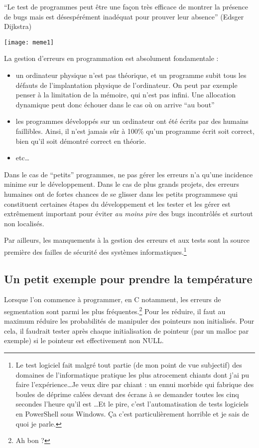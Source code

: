 \documentclass[../../../main.tex]{subfiles}
\begin{document}
``Le test de programmes peut être une façon très efficace de montrer la présence de bugs mais est désespérément inadéquat pour prouver leur absence'' (Edsger Dijkstra)
\begin{minipage}{\textwidth}
	\begin{center}
		\texttt{[image: meme1]}
	\end{center}
\end{minipage}

La gestion d'erreurs en programmation est absolument fondamentale :
\begin{itemize}
	\item un ordinateur physique n'est pas théorique, et un programme subit tous les défauts de l'implantation physique de l'ordinateur. On peut par exemple penser à la limitation de la mémoire, qui n'est pas infini. Une allocation dynamique peut donc échouer dans le cas où on arrive ``au bout''
	\item les programmes développés sur un ordinateur ont été écrits par des humains faillibles. Ainsi, il n'est jamais sûr à 100\% qu'un programme écrit soit correct, bien qu'il soit démontré correct en théorie.
	\item etc\dots
\end{itemize}
Dans le cas de ``petits'' programmes, ne pas gérer les erreurs n'a qu'une incidence minime sur le développement. Dans le cas de plus grands projets, des erreurs humaines ont de fortes chances de se glisser dans les petits programmese qui constituent certaines étapes du développement et les tester et les gérer est extrêmement important pour éviter \textit{au moins pire} des bugs incontrôlés et surtout non localisés.

Par ailleurs, les manquements à la gestion des erreurs et aux tests sont la source première des failles de sécurité des systèmes informatiques.\footnote{Le test logiciel fait malgré tout partie (de mon point de vue subjectif) des domaines de l'informatique pratique les plus atrocement chiants dont j'ai pu faire l'expérience\dots Je veux dire par chiant : un ennui morbide qui fabrique des boules de déprime calées devant des écrans à se demander toutes les cinq secondes l'heure qu'il est \dots Et le pire, c'est l'automatisation de tests logiciels en PowerShell sous Windows. Ça c'est particulièrement horrible et je sais de quoi je parle.}
\subsection{Un petit exemple pour prendre la température}
Lorsque l'on commence à programmer, en C notamment, les erreurs de segmentation sont parmi les plus fréquentes.\footnote{Ah bon ?} Pour les réduire, il faut au maximum réduire les probabilités de manipuler des
pointeurs non initialisés. Pour cela, il faudrait tester après chaque initialisation de pointeur (par un malloc par exemple) si le pointeur est effectivement non \textsf{NULL}.
\end{document}
